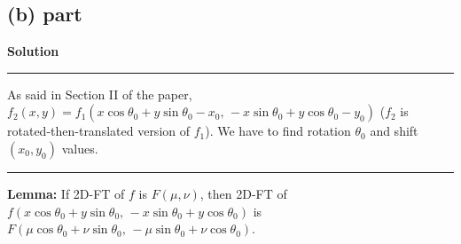 \documentclass[a4paper,12pt]{article}
\newenvironment{solution}[2][]{%
\begin{mdframed}[linecolor=blue!70!black, linewidth=2pt, roundcorner=10pt, backgroundcolor=yellow!10!white, skipabove=12pt, skipbelow=12pt]%
	\textbf{\large #2}
	\par\noindent\rule{\textwidth}{0.4pt}
}{
\end{mdframed}
}
\begin{document}
\subsection*{(b) part}
\begin{solution}{Solution}
	As said in Section II of the paper, $f_2(x, y) = f_1(x \cos \theta_0 + y \sin \theta_0 - x_0, \, - x \sin \theta_0 + y \cos \theta_0 - y_0)$ ($f_2$ is rotated-then-translated version of $f_1$). We have to find rotation $\theta_0$ and shift $(x_0, y_0)$ values.
	\vspace{5pt}
	\hrule
	\vspace{5pt}
	\textbf{Lemma:} If 2D-FT of $f$ is $F(\mu, \nu)$, then 2D-FT of $f(x \cos \theta_0 + y \sin \theta_0, \, - x \sin \theta_0 + y \cos \theta_0)$ is $F(\mu \cos \theta_0 + \nu \sin \theta_0, \, - \mu \sin \theta_0 + \nu \cos \theta_0)$.


\end{solution}
\end{document}
